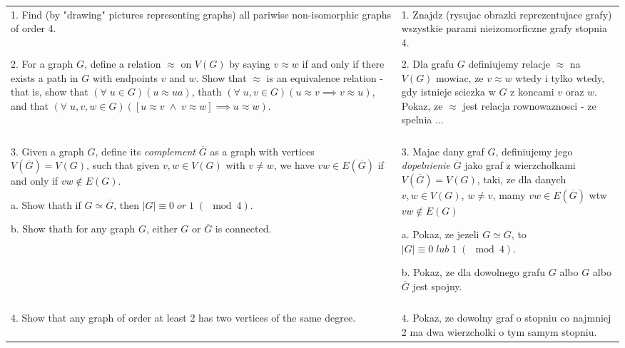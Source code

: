 \documentclass{article}[13pt]
\begin{document}
    \begin{tabularx}{\textwidth}{ X X }
        1. Find (by "drawing" pictures representing graphs) all pariwise non-isomorphic graphs of order 4. & 1. Znajdz (rysujac obrazki reprezentujace grafy) wszystkie parami nieizomorficzne grafy stopnia 4.\\

         & \\

        2. For a graph $G$, define a relation $\approx$ on $V(G)$ by saying $v\approx w$ if and only if there exists a path in $G$ with endpoints $v$ and $w$. Show that $\approx$ is an equivalence relation - that is, show that $(\forall\;u\in G)(u\approx ua)$, thath $(\forall\;u,v\in G)(u\approx v\implies v\approx u)$, and that $(\forall\;u,v,w\in G)([u\approx v\;\land\;v\approx w]\implies u\approx w)$. & 2. Dla grafu $G$ definiujemy relacje $\approx$ na $V(G)$ mowiac, ze $v\approx w$ wtedy i tylko wtedy, gdy istnieje sciezka w $G$ z koncami $v$ oraz $w$. Pokaz, ze $\approx$ jest relacja rownowaznosci - ze spelnia ...\\

         & \\

        3. Given a graph $G$, define its \emph{complement} $\overline G$ as a graph with vertices $V(\overline G)=V(G)$, such that given $v,w\in V(G)$ with $v\neq w$, we have $vw\in E(\overline G)$ if and only if $vw\notin E(G)$.

        a. Show thath if $G\simeq \overline G$, then $|G|\equiv0\;or\;1\;(\mod 4)$.

        b. Show thath for any graph $G$, either $G$ or $\overline G$ is connected. & 3. Majac dany graf $G$, definiujemy jego \emph{dopelnienie} $\overline G$ jako graf z wierzcholkami $V(\overline G)=V(G)$, taki, ze dla danych $v,w\in V(G)$, $w\neq v$, mamy $vw\in E(\overline G)$ wtw $vw\notin E(G)$

        a. Pokaz, ze jezeli $G\simeq \overline G$, to $|G|\equiv 0\;lub\;1\;(\mod 4)$.

        b. Pokaz, ze dla dowolnego grafu $G$ albo $G$ albo $\overline G$ jest spojny.\\

         & \\

        4. Show that any graph of order at least 2 has two vertices of the same degree. & 4. Pokaz, ze dowolny graf o stopniu co najmniej 2 ma dwa wierzcholki o tym samym stopniu.\\
        

\end{tabularx}
\end{document}
